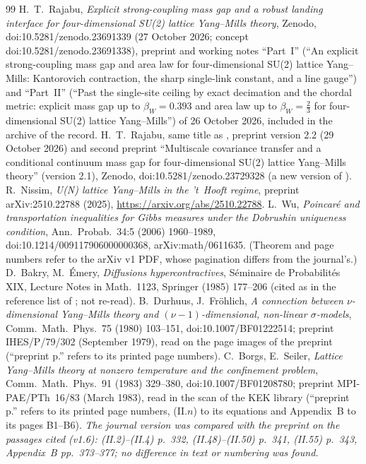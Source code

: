 \documentclass[11pt,a4paper]{article}
\theoremstyle{remark}
\theoremstyle{definition}
\theoremstyle{plain}
\theoremstyle{remark}
\begin{document}
\begin{thebibliography}{99}
 H.~T.~Rajabu, \emph{Explicit strong-coupling mass gap and a robust landing interface for four-dimensional SU(2) lattice Yang--Mills theory}, Zenodo, doi:10.5281/zenodo.23691339 (27 October 2026; concept doi:10.5281/zenodo.23691338), preprint and working notes ``Part~I'' (``An explicit strong-coupling mass gap and area law for four-dimensional SU(2) lattice Yang--Mills: Kantorovich contraction, the sharp single-link constant, and a line gauge'') and ``Part~II'' (``Past the single-site ceiling by exact decimation and the chordal metric: explicit mass gap up to $\beta_W=0.393$ and area law up to $\beta_W=\frac23$ for four-dimensional SU(2) lattice Yang--Mills'') of 26 October 2026, included in the archive of the record.
 H.~T.~Rajabu, same title as \cite{Raj26a}, preprint version 2.2 (29 October 2026) and second preprint ``Multiscale covariance transfer and a conditional continuum mass gap for four-dimensional SU(2) lattice Yang--Mills theory'' (version 2.1), Zenodo, doi:10.5281/zenodo.23729328 (a new version of \cite{Raj26a}).
 R.~Nissim, \emph{U(N) lattice Yang--Mills in the 't~Hooft regime}, preprint arXiv:2510.22788 (2025), \url{https://arxiv.org/abs/2510.22788}.
 L.~Wu, \emph{Poincar\'e and transportation inequalities for Gibbs measures under the Dobrushin uniqueness condition}, Ann.\ Probab.\ 34:5 (2006)
1960--1989, doi:10.1214/009117906000000368, arXiv:math/0611635. (Theorem and page numbers refer to the arXiv v1 PDF, whose pagination differs from the journal's.)
 D.~Bakry, M.~\'Emery, \emph{Diffusions hypercontractives}, S\'eminaire de Probabilit\'es XIX, Lecture Notes in Math.\ 1123, Springer (1985) 177--206
(cited as in the reference list of \cite{Wu06}; not re-read).
 B.~Durhuus, J.~Fr\"ohlich, \emph{A connection between $\nu$-dimensional Yang--Mills theory and $(\nu-1)$-dimensional, non-linear $\sigma$-models},
Comm.\ Math.\ Phys.\ 75 (1980) 103--151, doi:10.1007/BF01222514; preprint IHES/P/79/302 (September 1979), read on the page images of the preprint (``preprint p.''
refers to its printed page numbers).
 C.~Borgs, E.~Seiler, \emph{Lattice Yang--Mills theory at nonzero temperature and the confinement problem}, Comm.\ Math.\ Phys.\ 91 (1983) 329--380,
doi:10.1007/BF01208780; preprint MPI-PAE/PTh~16/83 (March 1983), read in the scan of the KEK library (``preprint p.'' refers to its printed page numbers, (II.$n$) to its
equations and Appendix~B to its pages B1--B6). \emph{The journal version was compared with the preprint on the passages cited (v1.6): (II.2)--(II.4) p.~332, (II.48)--(II.50) p.~341, (II.55) p.~343, Appendix~B pp.~373--377; no difference in text or numbering was found.}

\end{thebibliography}
\end{document}
